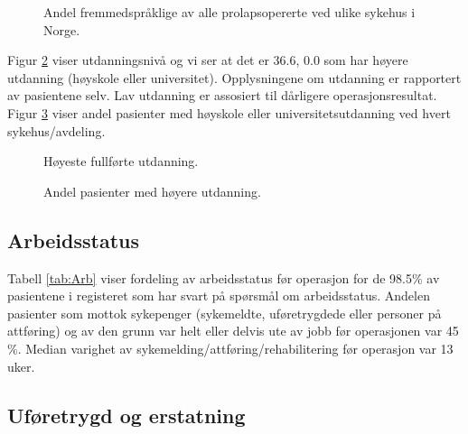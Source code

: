 \documentclass [norsk,a4paper,twoside]{article}\usepackage[]{graphicx}\usepackage[]{color}
\makeatletter
\newenvironment{kframe}{%
 \def\at@end@of@kframe{}%
 \ifinner\ifhmode%
  \def\at@end@of@kframe{\end{minipage}}%
  \begin{minipage}{\columnwidth}%
 \fi\fi%
 \def\FrameCommand##1{\hskip\@totalleftmargin \hskip-\fboxsep
 \colorbox{shadecolor}{##1}\hskip-\fboxsep
     \hskip-\linewidth \hskip-\@totalleftmargin \hskip\columnwidth}%
 \MakeFramed {\advance\hsize-\width
   \@totalleftmargin\z@ \linewidth\hsize
   \@setminipage}}%
 {\par\unskip\endMakeFramed%
 \at@end@of@kframe}
\makeatother
\begin{document}
\begin{figure}[ht]
\caption{\label{fig:Morsmal} Andel fremmedspråklige av alle prolapsopererte ved ulike sykehus i
Norge.}
\end{figure}




Figur \ref{fig:Utd} viser  utdanningsnivå og vi ser at det er 36.6, 0.0 som har høyere utdanning 
(høyskole eller universitet). Opplysningene om utdanning er rapportert av pasientene selv. 
Lav utdanning er assosiert til dårligere operasjonsresultat. Figur \ref{fig:HoyUtdAvd} viser andel 
pasienter med høyskole eller universitetsutdanning ved hvert sykehus/avdeling.


\begin{figure}[ht]
\caption{\label{fig:Utd} Høyeste fullførte utdanning.}
\end{figure}

\begin{figure}[ht]
\caption{\label{fig:HoyUtdAvd} Andel pasienter med høyere utdanning.}
\end{figure}


\clearpage

\subsection{Arbeidsstatus}

\begin{kframe}


{\ttfamily\noindent\bfseries{}}\end{kframe}

Tabell \ref{tab:Arb} viser fordeling av arbeidsstatus før operasjon for de 98.5\% 
av pasientene i registeret som har svart på spørsmål om arbeidsstatus. 
Andelen pasienter som mottok sykepenger (sykemeldte, uføretrygdede eller personer 
på attføring) og av den grunn var helt eller delvis ute av jobb før operasjonen var 
45 \%. 
Median varighet av sykemelding/attføring/rehabilitering  før operasjon var 
13 uker.




\subsection{Uføretrygd og erstatning }
\end{document}

